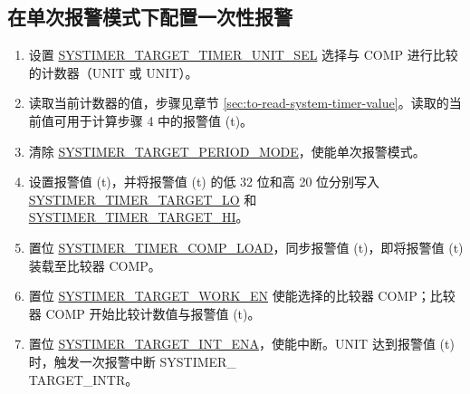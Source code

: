 \documentclass[main\_\_CN.tex]{subfiles}
\begin{document}
\subsection{在单次报警模式下配置一次性报警}
\begin{enumerate}
    \item 设置 \hyperref[fielddesc:SYSTIMERTARGET0TIMERUNITSEL]{SYSTIMER\_TARGET\_TIMER\_UNIT\_SEL} 选择与 COMP 进行比较的计数器（UNIT 或 UNIT）。
    \item 读取当前计数器的值，步骤见章节  \ref{sec:to-read-system-timer-value}。读取的当前值可用于计算步骤 4 中的报警值 (t)。
    \item 清除 \hyperref[fielddesc:SYSTIMERTARGET0PERIODMODE]{SYSTIMER\_TARGET\_PERIOD\_MODE}，使能单次报警模式。
    \item 设置报警值 (t)，并将报警值 (t) 的低 32 位和高 20 位分别写入   \hyperref[fielddesc:SYSTIMERTIMERTARGET0LO]{SYSTIMER\_TIMER\_TARGET\_LO} 和 \hyperref[fielddesc:SYSTIMERTIMERTARGET0HI]{SYSTIMER\_TIMER\_TARGET\_HI}。
    \item 置位 \hyperref[fielddesc:SYSTIMERTIMERCOMP0LOAD]{SYSTIMER\_TIMER\_COMP\_LOAD}，同步报警值 (t)，即将报警值 (t) 装载至比较器 COMP。
    \item 置位 \hyperref[fielddesc:SYSTIMERTARGET0WORKEN]{SYSTIMER\_TARGET\_WORK\_EN} 使能选择的比较器 COMP；比较器 COMP 开始比较计数值与报警值 (t)。
    \item 置位 \hyperref[fielddesc:SYSTIMERTARGET0INTENA]{SYSTIMER\_TARGET\_INT\_ENA}，使能中断。UNIT 达到报警值 (t) 时，触发一次报警中断 SYSTIMER\_\\TARGET{}\_INTR。
\end{enumerate}
\end{document}
